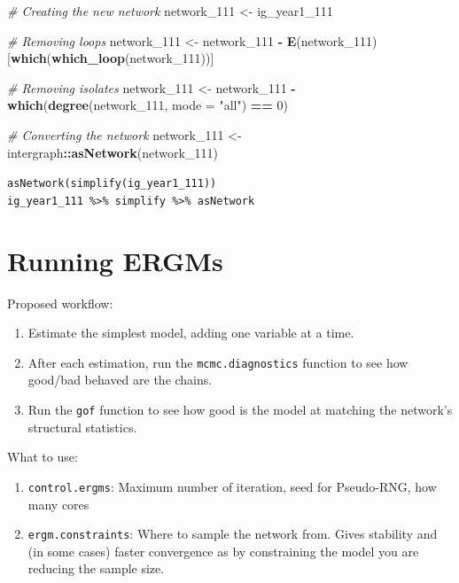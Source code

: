\documentclass[]{book}
\newenvironment{Shaded}{\begin{snugshade}}{\end{snugshade}}
\newcommand{\KeywordTok}[1]{\textcolor[rgb]{0.13,0.29,0.53}{\textbf{#1}}}
\newcommand{\DataTypeTok}[1]{\textcolor[rgb]{0.13,0.29,0.53}{#1}}
\newcommand{\DecValTok}[1]{\textcolor[rgb]{0.00,0.00,0.81}{#1}}
\newcommand{\StringTok}[1]{\textcolor[rgb]{0.31,0.60,0.02}{#1}}
\newcommand{\CommentTok}[1]{\textcolor[rgb]{0.56,0.35,0.01}{\textit{#1}}}
\newcommand{\OperatorTok}[1]{\textcolor[rgb]{0.81,0.36,0.00}{\textbf{#1}}}
\newcommand{\NormalTok}[1]{#1}
\theoremstyle{definition}
\theoremstyle{definition}
\theoremstyle{definition}
\theoremstyle{remark}
\begin{document}
\begin{Shaded}
\begin{Highlighting}[]
\CommentTok{# Creating the new network}
\NormalTok{network_}\DecValTok{111}\NormalTok{ <-}\StringTok{ }\NormalTok{ig_year1_}\DecValTok{111}

\CommentTok{# Removing loops}
\NormalTok{network_}\DecValTok{111}\NormalTok{ <-}\StringTok{ }\NormalTok{network_}\DecValTok{111} \OperatorTok{-}\StringTok{ }\KeywordTok{E}\NormalTok{(network_}\DecValTok{111}\NormalTok{)[}\KeywordTok{which}\NormalTok{(}\KeywordTok{which_loop}\NormalTok{(network_}\DecValTok{111}\NormalTok{))]}

\CommentTok{# Removing isolates}
\NormalTok{network_}\DecValTok{111}\NormalTok{ <-}\StringTok{ }\NormalTok{network_}\DecValTok{111} \OperatorTok{-}\StringTok{ }\KeywordTok{which}\NormalTok{(}\KeywordTok{degree}\NormalTok{(network_}\DecValTok{111}\NormalTok{, }\DataTypeTok{mode =} \StringTok{"all"}\NormalTok{) }\OperatorTok{==}\StringTok{ }\DecValTok{0}\NormalTok{)}

\CommentTok{# Converting the network}
\NormalTok{network_}\DecValTok{111}\NormalTok{ <-}\StringTok{ }\NormalTok{intergraph}\OperatorTok{::}\KeywordTok{asNetwork}\NormalTok{(network_}\DecValTok{111}\NormalTok{)}
\end{Highlighting}
\end{Shaded}

\texttt{asNetwork(simplify(ig\_year1\_111))}
\texttt{ig\_year1\_111\ \%\textgreater{}\%\ simplify\ \%\textgreater{}\%\ asNetwork}

\section{Running ERGMs}\label{running-ergms}

Proposed workflow:

\begin{enumerate}
\def\labelenumi{\arabic{enumi}.}
\item
  Estimate the simplest model, adding one variable at a time.
\item
  After each estimation, run the \texttt{mcmc.diagnostics} function to
  see how good/bad behaved are the chains.
\item
  Run the \texttt{gof} function to see how good is the model at matching
  the network's structural statistics.
\end{enumerate}

What to use:

\begin{enumerate}
\def\labelenumi{\arabic{enumi}.}
\item
  \texttt{control.ergms}: Maximum number of iteration, seed for
  Pseudo-RNG, how many cores
\item
  \texttt{ergm.constraints}: Where to sample the network from. Gives
  stability and (in some cases) faster convergence as by constraining
  the model you are reducing the sample size.
\end{enumerate}
\end{document}
